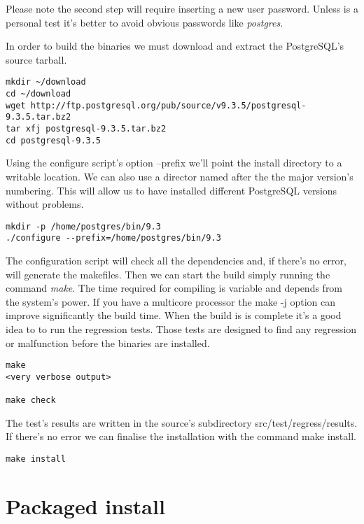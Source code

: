 Please note the second step will require inserting a new user password. Unless is a personal
test it's better to avoid obvious passwords like \textit{postgres}.\newline

In order to build the binaries we must download and extract the PostgreSQL's source tarball.

\begin{verbatim}
mkdir ~/download
cd ~/download
wget http://ftp.postgresql.org/pub/source/v9.3.5/postgresql-9.3.5.tar.bz2
tar xfj postgresql-9.3.5.tar.bz2
cd postgresql-9.3.5
\end{verbatim}


Using the configure script's option --prefix we'll point the install directory to a writable
location. We can also use a director named after the the major version's numbering. This will allow
us to have installed different PostgreSQL versions without problems.

\begin{verbatim}
mkdir -p /home/postgres/bin/9.3
./configure --prefix=/home/postgres/bin/9.3
\end{verbatim}

The configuration script will check all the dependencies and, if there's no error, will generate 
the makefiles. Then we can start the build simply running the command \textit{make}. The time
required for compiling is variable and depends from the system's power. If you have a multicore
processor the make -j option can improve significantly the build time. When the build is is complete
it's a good idea to to run the regression tests. Those tests are designed to find any regression or
malfunction before the binaries are installed.

\begin{verbatim}
make
<very verbose output>

make check 

\end{verbatim}

The test's results are written in the source's subdirectory src/test/regress/results. If
there's no error we can finalise the installation with the command make install.

\begin{verbatim}
make install
\end{verbatim}



\section{Packaged install}
\label{sec:DEBIAN_INSTALL}

